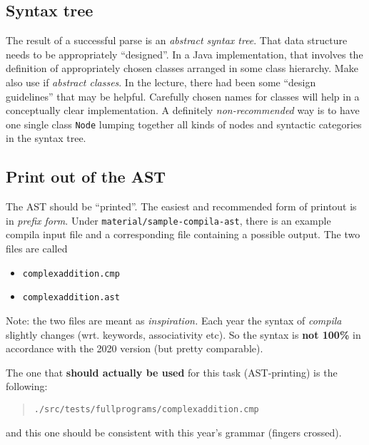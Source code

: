 \documentclass[10pt,freeform]{handout}[2014/08/13]
\begin{document}
\subsection{Syntax tree}
\label{sec:syntax-tree}

The result of a successful parse is an \emph{abstract syntax tree}. That
data structure needs to be appropriately ``designed''. In a Java
implementation, that involves the definition of appropriately chosen
classes arranged in some class hierarchy. Make also use if \emph{abstract
  classes}. In the lecture, there had been some ``design guidelines'' that
may be helpful. Carefully chosen names for classes will help in a
conceptually clear implementation. A definitely \emph{non-recommended} way
is to have one single class \texttt{Node} lumping together all kinds of
nodes and syntactic categories in the syntax tree.









\subsection{Print out of the AST}
\label{sec:print-out-ast}


The AST should be ``printed''. The easiest and recommended form of printout
is in \emph{prefix form}. Under \texttt{material/sample-compila-ast}, there
is an example compila input file and a corresponding file containing a
possible output. The two files are called

\begin{itemize}
\item \texttt{complexaddition.cmp}
\item \texttt{complexaddition.ast}
\end{itemize}


Note: the two files are meant as \emph{inspiration.} Each year the syntax
of \textsl{compila} slightly changes (wrt. keywords, associativity etc). So
the syntax is \textbf{not 100\%} in accordance with the 2020 version (but
pretty comparable).

The one that \textbf{should actually be used} for this task (AST-printing)
is the following:

\begin{quote}
  \texttt{./src/tests/fullprograms/complexaddition.cmp}  
\end{quote}

and this one should be consistent with this year's grammar (fingers
crossed).
\end{document}

